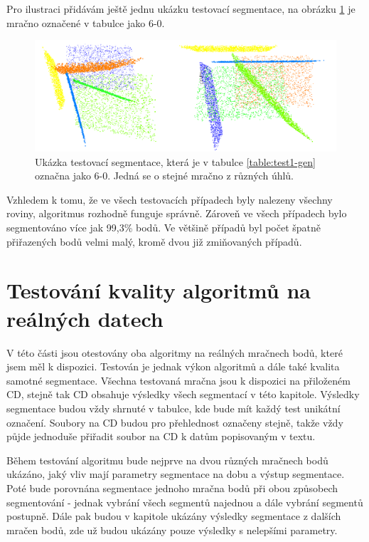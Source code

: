 \documentclass[11pt,twoside,a4paper]{book}
\begin{document}
Pro ilustraci přidávám ještě jednu ukázku testovací segmentace, na obrázku \ref{fig:test-6-0} je mračno označené v tabulce jako 6-0.

\begin{figure}[H]
\begin{center}
\includegraphics[width=\textwidth]{figures/test-6-0}
\caption{Ukázka testovací segmentace, která je v tabulce \ref{table:test1-gen} označna jako 6-0. Jedná se o stejné mračno z různých úhlů.}
\label{fig:test-6-0}
\end{center}
\end{figure}

Vzhledem k tomu, že ve všech testovacích případech byly nalezeny všechny roviny, algoritmus rozhodně funguje správně. Zároveň ve všech případech bylo segmentováno více jak 99,3\% bodů. Ve většině případů byl počet špatně přiřazených bodů velmi malý, kromě dvou již zmiňovaných případů.

\newpage
\section{Testování kvality algoritmů na reálných datech}

V této části jsou otestovány oba algoritmy na reálných mračnech bodů, které jsem měl k dispozici. Testován je jednak výkon algoritmů a dále také kvalita samotné segmentace. Všechna testovaná mračna jsou k dispozici na přiloženém CD, stejně tak CD obsahuje výsledky všech segmentací v této kapitole. Výsledky segmentace budou vždy shrnuté v tabulce, kde bude mít každý test unikátní označení. Soubory na CD budou pro přehlednost označeny stejně, takže vždy půjde jednoduše přiřadit soubor na CD k datům popisovaným v textu.

Během testování algoritmu bude nejprve na dvou různých mračnech bodů ukázáno, jaký vliv mají parametry segmentace na dobu a výstup segmentace. Poté bude porovnána segmentace jednoho mračna bodů při obou způsobech segmentování - jednak vybrání všech segmentů najednou a dále vybrání segmentů postupně. Dále pak budou v kapitole ukázány výsledky segmentace z dalších mračen bodů, zde už budou ukázány pouze výsledky s nelepšími parametry.
\end{document}
